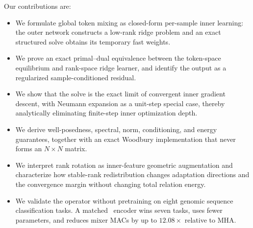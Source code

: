 Our contributions are:
\begin{itemize}
  \item We formulate global token mixing as closed-form per-sample inner
  learning: the outer network constructs a low-rank ridge problem and an exact
  structured solve obtains its temporary fast weights.
  \item We prove an exact primal--dual equivalence between the token-space
  equilibrium and rank-space ridge learner, and identify the output as a
  regularized sample-conditioned residual.
  \item We show that the solve is the exact limit of convergent inner gradient
  descent, with Neumann expansion as a unit-step special case, thereby
  analytically eliminating finite-step inner optimization depth.
  \item We derive well-posedness, spectral, norm, conditioning, and energy
  guarantees, together with an exact Woodbury implementation that never forms
  an $N\times N$ matrix.
  \item We interpret rank rotation as inner-feature geometric augmentation and
  characterize how stable-rank redistribution changes adaptation directions
  and the convergence margin without changing total relation energy.
  \item We validate the operator without pretraining on eight genomic sequence
  classification tasks. A matched \RRLSSO\ encoder wins seven tasks, uses fewer
  parameters, and reduces mixer MACs by up to $12.08\times$ relative to MHA.
\end{itemize}
